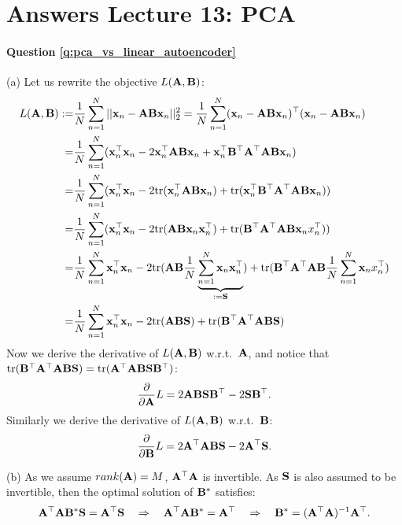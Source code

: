 \section{Answers Lecture 13: PCA}

\paragraph{Question \ref{q:pca_vs_linear_autoencoder}}
(a) Let us rewrite the objective $L(\mathbf A, \mathbf B)$:
\begin{equation*}
\begin{aligned}
L(\mathbf A, \mathbf B) :=& \frac{1}{N} \sum_{n=1}^N || \mathbf{x}_n - \mathbf A \mathbf B \mathbf{x}_n ||_2^2 = \frac{1}{N} \sum_{n=1}^N (\mathbf{x}_n - \mathbf A \mathbf B \mathbf{x}_n)^\top (\mathbf{x}_n - \mathbf A \mathbf B \mathbf{x}_n) \\
=& \frac{1}{N} \sum_{n=1}^N (\mathbf{x}_n^\top \mathbf{x}_n - 2 \mathbf{x}_n^\top \mathbf A \mathbf B \mathbf{x}_n + \mathbf{x}_n^\top \mathbf B^\top \mathbf A^\top \mathbf A \mathbf B \mathbf{x}_n) \\
=& \frac{1}{N} \sum_{n=1}^N (\mathbf{x}_n^\top \mathbf{x}_n - 2 \text{tr}(\mathbf{x}_n^\top \mathbf A \mathbf B \mathbf{x}_n) + \text{tr}(\mathbf{x}_n^\top \mathbf B^\top \mathbf A^\top \mathbf A \mathbf B \mathbf{x}_n)) \\
=& \frac{1}{N} \sum_{n=1}^N (\mathbf{x}_n^\top \mathbf{x}_n - 2 \text{tr}(\mathbf A \mathbf B \mathbf{x}_n \mathbf{x}_n^\top ) + \text{tr}(\mathbf B^\top \mathbf A^\top \mathbf A \mathbf B \mathbf{x}_n x_n^\top )) \\
=& \frac{1}{N} \sum_{n=1}^N \mathbf{x}_n^\top \mathbf{x}_n - 2 \text{tr}(\mathbf A \mathbf B \frac{1}{N} \underbrace{\sum_{n=1}^N \mathbf{x}_n \mathbf{x}_n^\top}_{:=\mathbf{S}} ) + \text{tr}(\mathbf B^\top \mathbf A^\top \mathbf A \mathbf B \frac{1}{N} \sum_{n=1}^N \mathbf{x}_n x_n^\top ) \\
=& \frac{1}{N} \sum_{n=1}^N \mathbf{x}_n^\top \mathbf{x}_n - 2 \text{tr}(\mathbf A \mathbf B \mathbf{S} ) + \text{tr}(\mathbf B^\top \mathbf A^\top \mathbf A \mathbf B \mathbf{S} )
\end{aligned}
\end{equation*}
Now we derive the derivative of $L(\mathbf A, \mathbf B)$ w.r.t.~$\mathbf A$, and notice that $ \text{tr}(\mathbf B^\top \mathbf A^\top \mathbf A \mathbf B \mathbf{S} ) =  \text{tr}(\mathbf A^\top \mathbf A \mathbf B \mathbf{S} \mathbf B^\top )$:
\begin{equation*}
\frac{\partial}{\partial \mathbf A} L = 2 \mathbf A \mathbf B \mathbf{S} \mathbf B^\top - 2 \mathbf{S} \mathbf B^\top.
\end{equation*}
Similarly we derive the derivative of $L(\mathbf A, \mathbf B)$ w.r.t.~$\mathbf B$:
\begin{equation*}
\frac{\partial}{\partial \mathbf B} L = 2 \mathbf A^\top \mathbf A \mathbf B \mathbf{S} - 2 \mathbf A^\top \mathbf{S}.
\end{equation*}

(b) As we assume $rank(\mathbf A) = M$, $\mathbf A^\top \mathbf A$ is invertible. As $\mathbf{S}$ is also assumed to be invertible, then the optimal solution of $\mathbf B^*$ satisfies:
$$ \mathbf A^\top \mathbf A \mathbf B^* \mathbf{S} =\mathbf A^\top \mathbf{S} \quad \Rightarrow \quad  \mathbf A^\top \mathbf A \mathbf B^* =\mathbf A^\top \quad \Rightarrow \quad \mathbf B^* = (\mathbf A^\top \mathbf A)^{-1} \mathbf A^\top.$$

